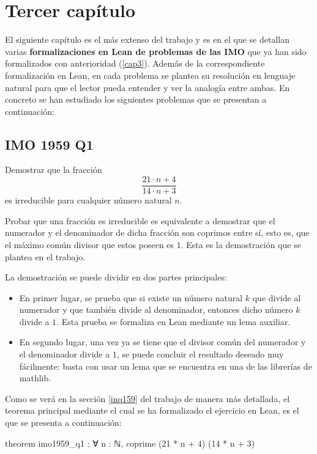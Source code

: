 \section{Tercer capítulo}

El siguiente capítulo es el más extenso del trabajo y es en el que se
detallan varias \textbf{formalizaciones en Lean de problemas de las IMO}
que ya han sido formalizados con anterioridad (\ref{cap3}). Además de la
correspondiente formalización en Lean, en cada problema se plantea su
resolución en lenguaje natural para que el lector pueda entender y ver
la analogía entre ambas. En concreto se han estudiado los siguientes
problemas que se presentan a continuación:

\subsection{IMO 1959 Q1}

\noindent
Demostrar que la fracción
\[\frac{21⋅n+4}{14⋅n+3}\]
es irreducible para cualquier número natural \(n\).

Probar que una fracción es irreducible es equivalente a demostrar que el
numerador y el denominador de dicha fracción son coprimos entre sí, esto
es, que el máximo común divisor que estos poseen es \(1\). Esta es la
demostración que se plantea en el trabajo.

La demostración se puede dividir en dos partes principales:
\begin{itemize}
\item En primer lugar, se prueba que si existe un número natural \(k\)
  que divide al numerador y que también divide al denominador, entonces
  dicho número \(k\) divide a \(1\). Esta prueba se formaliza en Lean
  mediante un lema auxiliar.

\item En segundo lugar, una vez ya se tiene que el divisor común del
  numerador y el denominador divide a \(1\), se puede concluir el
  resultado deseado muy fácilmente: basta con usar un lema que se
  encuentra en una de las librerías de mathlib.
\end{itemize}

Como se verá en la sección \ref{inq159} del trabajo de manera más
detallada, el teorema principal mediante el cual se ha formalizado el
ejercicio en Lean, es el que se presenta a continuación:
\begin{leancode}
theorem imo1959_q1 : ∀ n : ℕ, coprime (21 * n + 4) (14 * n + 3)
\end{leancode}

